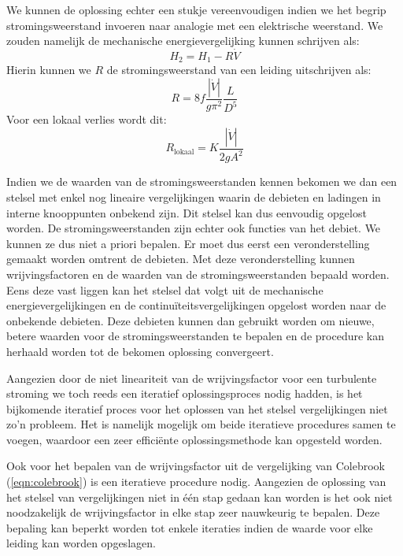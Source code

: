 We kunnen de oplossing echter een stukje vereenvoudigen indien we het begrip stromingsweerstand invoeren naar analogie met een elektrische weerstand. We zouden namelijk de mechanische energievergelijking kunnen schrijven als:
\begin{equation}
	H_2 = H_1 - R \dot{V}			
\end{equation}
Hierin kunnen we $R$ de stromingsweerstand van een leiding uitschrijven als:
\begin{equation}
	R = 8 f \dfrac{|\dot{V}|}{g \pi^2} \dfrac{L}{D^5}	
\end{equation}
Voor een lokaal verlies wordt dit:
\begin{equation}
	R_\mathrm{lokaal} = K \frac{|\dot{V}|}{2 g A^2}
\end{equation}

Indien we de waarden van de stromingsweerstanden kennen bekomen we dan een stelsel met enkel nog lineaire vergelijkingen waarin de debieten en ladingen in interne knooppunten onbekend zijn. Dit stelsel kan dus eenvoudig opgelost worden.
De stromingsweerstanden zijn echter ook functies van het debiet. We kunnen ze dus niet a priori bepalen. Er moet dus eerst een veronderstelling gemaakt worden omtrent de debieten. Met deze veronderstelling kunnen wrijvingsfactoren en de waarden van de stromingsweerstanden bepaald worden. Eens deze vast liggen kan het stelsel dat volgt uit de mechanische energievergelijkingen en de continuïteitsvergelijkingen opgelost worden naar de onbekende debieten. Deze debieten kunnen dan gebruikt worden om nieuwe, betere waarden voor de stromingsweerstanden te bepalen en de procedure kan herhaald worden tot de bekomen oplossing convergeert. 

Aangezien door de niet lineariteit van de wrijvingsfactor voor een turbulente stroming we toch reeds een iteratief oplossingsproces nodig hadden, is het bijkomende iteratief proces voor het oplossen van het stelsel vergelijkingen niet zo'n probleem. Het is namelijk mogelijk om beide iteratieve procedures samen te voegen, waardoor een zeer efficiënte oplossingsmethode kan opgesteld worden.

Ook voor het bepalen van de wrijvingsfactor uit de vergelijking van Colebrook (\ref{eqn:colebrook}) is een iteratieve procedure nodig. Aangezien de oplossing van het stelsel van vergelijkingen niet in één stap gedaan kan worden is het ook niet noodzakelijk de wrijvingsfactor in elke stap zeer nauwkeurig te bepalen. Deze bepaling kan beperkt worden tot enkele iteraties indien de waarde voor elke leiding kan worden opgeslagen.

